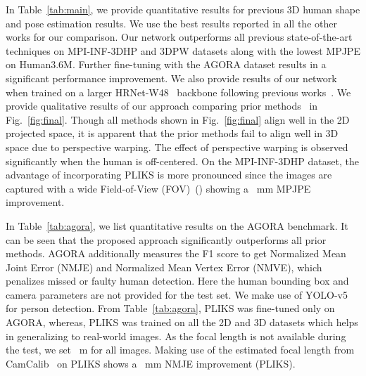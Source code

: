 \documentclass[10pt,twocolumn,letterpaper]{article}
\begin{document}
In Table~\ref{tab:main}, we provide quantitative results for previous 3D human shape and pose estimation results. We use the best results reported in all the other works for our comparison. 
Our network outperforms all previous state-of-the-art techniques on MPI-INF-3DHP and 3DPW datasets along with the lowest MPJPE on Human3.6M. Further fine-tuning with the AGORA dataset results in a significant performance improvement. We also provide results of our network when trained on a larger HRNet-W48~\cite{hrnet} backbone following previous works~\cite{cliff,pymafx2022,meshgraph}.
We provide qualitative results of our approach comparing prior methods~\cite{cliff,hybrik} in Fig.~\ref{fig:final}. Though all methods shown in Fig.~\ref{fig:final}  align well in the 2D projected space, it is apparent that the prior methods fail to align well in 3D space due to perspective warping. The effect of perspective warping is observed significantly when the human is off-centered. On the MPI-INF-3DHP dataset, the advantage of incorporating PLIKS is more pronounced since the images are captured with a wide Field-of-View (FOV)~() showing a ~mm MPJPE improvement. 


In Table~\ref{tab:agora}, we list quantitative results on the AGORA benchmark. It can be seen that the proposed approach significantly outperforms all prior methods. AGORA additionally measures the F1 score to get Normalized Mean Joint Error (NMJE) and
Normalized Mean Vertex Error (NMVE), which penalizes missed or faulty human detection. Here the human bounding box and camera parameters are not provided for the test set. We make use of YOLO-v5~\cite{yolo,h4w} for person detection. From Table~\ref{tab:agora}, PLIKS was fine-tuned only on AGORA, whereas, PLIKS was trained on all the 2D and 3D datasets which helps in generalizing to real-world images. As the focal length is not available during the test, we set ~m for all images. Making use of the estimated focal length from CamCalib~\cite{spec} on PLIKS shows a ~mm NMJE improvement (PLIKS).
\end{document}
